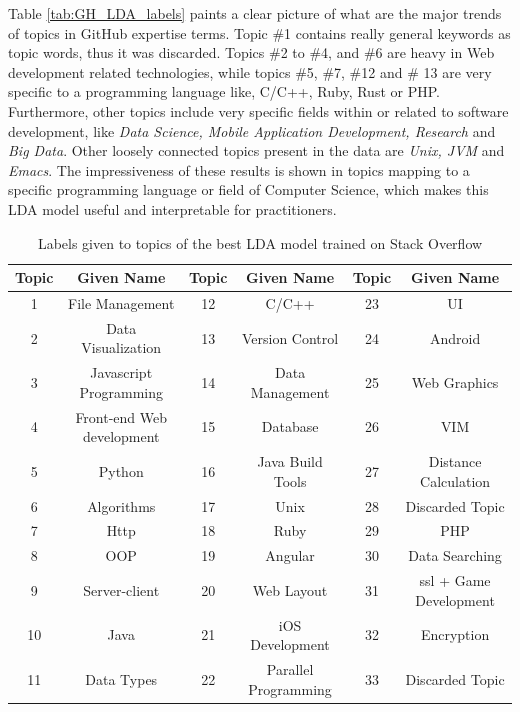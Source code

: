             Table \ref{tab:GH_LDA_labels} paints a clear picture of what are the major trends of topics in GitHub expertise terms. Topic \#1 contains really general keywords as topic words, thus it was discarded. Topics \#2 to \#4, and \#6 are heavy in Web development related technologies, while topics \#5, \#7, \#12 and \# 13 are very specific to a programming language like, C/C++, Ruby, Rust or PHP. Furthermore, other topics include very specific fields within or related to software development, like \emph{Data Science, Mobile Application Development, Research} and \emph{Big Data}. Other loosely connected topics present in the data are \emph{Unix, JVM} and \emph{Emacs}. The impressiveness of these results is shown in topics mapping to a specific programming language or field of Computer Science, which makes this LDA model useful and interpretable for practitioners.  
            
            \begin{table}
              \centering
              \caption{Labels given to topics of the best LDA model trained on Stack Overflow}\label{tab:SO_LDA_labels}
                \vspace{6pt} %
               \resizebox{\textwidth}{!} {
              \begin{tabular}{|c c|c c|c c|}
                \hline
                Topic & Given Name & Topic & Given Name & Topic & Given Name \\
                \hline
                1 & File Management & 12 & C/C++ & 23 & UI \\
                2 & Data Visualization & 13 & Version Control & 24 & Android \\
                3 & Javascript Programming & 14 & Data Management & 25 & Web Graphics \\
                4 & Front-end Web development & 15 & Database & 26 & VIM \\
                5 & Python & 16 & Java Build Tools & 27 & Distance Calculation \\
                6 & Algorithms & 17 & Unix & 28 & Discarded Topic \\
                7 & Http & 18 & Ruby & 29 & PHP \\
                8 & OOP & 19 & Angular & 30 & Data Searching \\
                9 & Server-client & 20 & Web Layout & 31 & ssl + Game Development \\
                10 & Java & 21 & iOS Development & 32 & Encryption \\
                11 & Data Types & 22 & Parallel Programming & 33 & Discarded Topic \\
                \hline
              \end{tabular}}
            \end{table}
            

